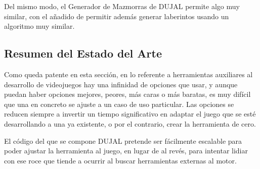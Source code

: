 Del mismo modo, el Generador de Mazmorras de DUJAL permite algo muy similar, con el añadido de permitir además generar laberintos usando un algoritmo muy similar.

\subsection{Resumen del Estado del Arte}
Como queda patente en esta sección, en lo referente a herramientas auxiliares al desarrollo de videojuegos hay una infinidad de opciones que usar, y aunque puedan haber opciones mejores, peores, más caras o más baratas,
es muy difícil que una en concreto se ajuste a un caso de uso particular. Las opciones se reducen siempre a invertir un tiempo significativo en adaptar el juego que se esté desarrollando a una ya existente, o por el contrario, 
crear la herramienta de cero.

El código del que se compone DUJAL pretende ser fácilmente escalable para poder ajustar la herramienta al juego, en lugar de al revés, para intentar lidiar con ese roce que tiende a ocurrir al 
buscar herramientas externas al motor.